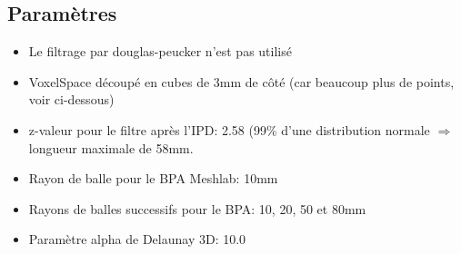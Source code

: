 \documentclass[a4paper,10pt]{report}
\begin{document}
\subsection{Paramètres}
\begin{itemize}
	\item Le filtrage par douglas-peucker n'est pas utilisé
    \item VoxelSpace découpé en cubes de 3mm de côté (car beaucoup plus de points, voir ci-dessous)
    \item z-valeur pour le filtre après l'IPD: 2.58 (99\% d'une distribution normale $\Rightarrow$ longueur maximale de 58mm.
    \item Rayon de balle pour le BPA Meshlab: 10mm
    \item Rayons de balles successifs pour le BPA: 10, 20, 50 et 80mm
    \item Paramètre alpha de Delaunay 3D: 10.0
\end{itemize}
\end{document}
